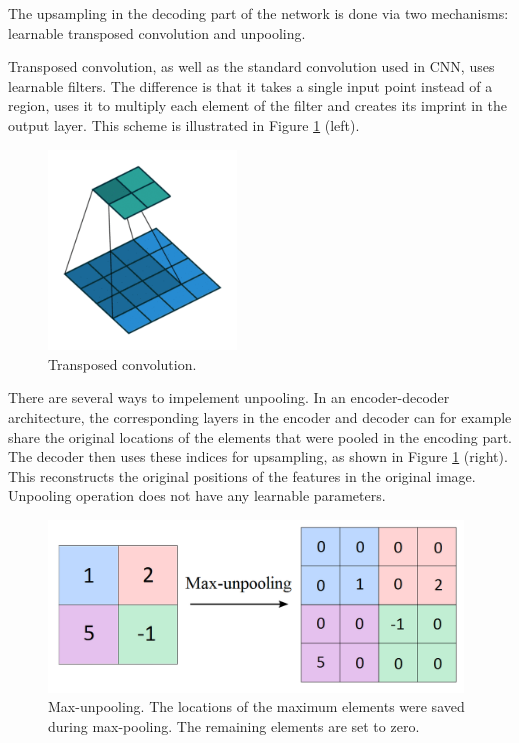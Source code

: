 The upsampling in the decoding part of the network is done via two mechanisms: learnable transposed convolution and unpooling. 

Transposed convolution, as well as the standard convolution used in CNN, uses learnable filters. The difference is that it takes a single input point instead of a region, uses it to multiply each element of the filter and creates its imprint in the output layer. This scheme is illustrated in Figure \ref{transposed} (left).

\vspace{4mm}
\begin{figure}[h]
	\begin{center}
		\includegraphics*[width=5cm, keepaspectratio]{obr/transposed.png}
	\end{center}
	\vspace{4mm}
	\caption{Transposed convolution. \cite{theano}} 
	\label{transposed}
\end{figure}

There are several ways to impelement unpooling. In an encoder-decoder architecture, the corresponding layers in the encoder and decoder can for example share the original locations of the elements that were pooled in the encoding part. The decoder then uses these indices for upsampling, as shown in Figure \ref{transposed} (right). This reconstructs the original positions of the features in the original image. Unpooling operation does not have any learnable parameters. 

\vspace{4mm}
\begin{figure}[h]
	\begin{center}
		\includegraphics*[width=11cm, keepaspectratio]{obr/unpool.png}
	\end{center}
	\vspace{4mm}
	\caption{Max-unpooling. The locations of the maximum elements were saved during max-pooling. The remaining elements are set to zero.} 
	\label{unpool}
\end{figure}

